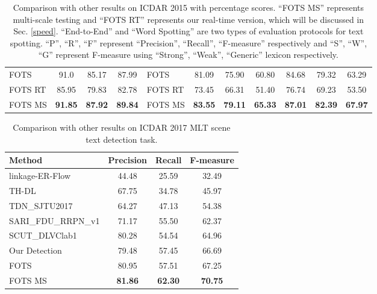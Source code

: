 \documentclass[10pt,twocolumn,letterpaper]{article}
\begin{document}
\begin{table*}
\begin{center}
\begin{tabular}{l|ccc|l|ccc|ccc}
FOTS & 91.0 &	85.17 &	87.99 & FOTS & 81.09 & 75.90 & 60.80 & 84.68 & 79.32 & 63.29 \\
FOTS RT & 85.95 & 79.83&	82.78 & FOTS RT & 73.45 & 66.31 & 51.40 &76.74 &69.23 &53.50 \\
FOTS MS &\textbf{91.85}&\textbf{87.92}&\textbf{89.84}& FOTS MS &\textbf{83.55}&\textbf{79.11}&\textbf{65.33}&\textbf{87.01}&\textbf{82.39}&\textbf{67.97} \\ \hline
\end{tabular}
\end{center}
\caption{Comparison with other results on ICDAR 2015 with percentage scores. ``FOTS MS'' represents multi-scale testing and ``FOTS RT'' represents our real-time version, which will be discussed in Sec. \ref{speed}. ``End-to-End'' and ``Word Spotting'' are two types of evaluation protocols for text spotting. ``P'', ``R'', ``F'' represent ``Precision'', ``Recall'', ``F-measure'' respectively and ``S'', ``W'', ``G'' represent F-measure using ``Strong'', ``Weak'', ``Generic'' lexicon respectively.}
\label{tab:icdar15_detect_compare}
\end{table*}

\begin{table}
\small
\begin{center}
\begin{tabular}{l|ccc}
\hline
Method    & Precision   & Recall   & F-measure \\ \hline
linkage-ER-Flow \cite{icdar17} & 44.48 & 25.59 & 32.49   \\
TH-DL \cite{icdar17} & 67.75 &	34.78 &	45.97    \\
TDN\_SJTU2017 \cite{icdar17} & 64.27 &	47.13 &	54.38  \\
SARI\_FDU\_RRPN\_v1 \cite{ma2017rcnn} & 71.17 & 55.50 &	62.37   \\
SCUT\_DLVClab1 \cite{icdar17} & 80.28 &	54.54 &	64.96   \\ \hline
Our Detection & 79.48&	57.45&	66.69\\
FOTS & 80.95&	57.51&	67.25    \\
FOTS MS &\textbf{81.86}&\textbf{62.30}&	\textbf{70.75} \\ \hline
\end{tabular}
\end{center}
\caption{Comparison with other results on ICDAR 2017 MLT scene text detection task.}
\label{tab:MLT_detect_compare}
\end{table}
\end{document}
